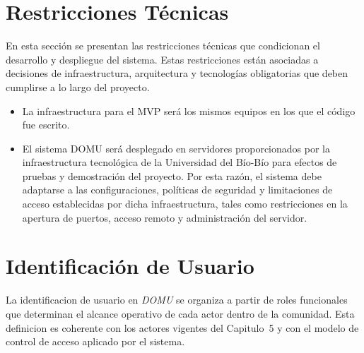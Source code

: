 \section{Restricciones Técnicas}
En esta sección se presentan las restricciones técnicas que condicionan el desarrollo y despliegue del sistema. Estas restricciones están asociadas a decisiones de infraestructura, arquitectura y tecnologías obligatorias que deben cumplirse a lo largo del proyecto.

\begin{itemize}
    \item La infraestructura para el MVP será los mismos equipos en los que el código fue escrito.
    \item El sistema DOMU será desplegado en servidores proporcionados por la infraestructura tecnológica de la Universidad del Bío-Bío para efectos de pruebas y demostración del proyecto.  Por esta razón, el sistema debe adaptarse a las configuraciones, políticas de seguridad y limitaciones de acceso establecidas por dicha infraestructura, tales como restricciones en la apertura de puertos, acceso remoto y administración del servidor.
\end{itemize}

\section{Identificación de Usuario}
La identificacion de usuario en \textit{DOMU} se organiza a partir de roles funcionales que determinan el alcance operativo de cada actor dentro de la comunidad. Esta definicion es coherente con los actores vigentes del Capitulo~5 y con el modelo de control de acceso aplicado por el sistema.


